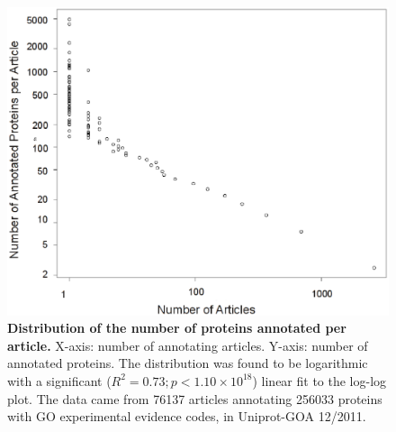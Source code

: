 \documentclass[12pt]{article}
\begin{document}
\begin{figure}[!ht]
\begin{center}
\includegraphics[width=6in]{papers-prots.eps}
\end{center}
\caption{
{\bf Distribution of the number of proteins annotated per article.} X-axis: number of annotating
articles. Y-axis: number of annotated proteins. The distribution was found to be logarithmic with a
significant ($R^2=0.73; p<1.10\times 10^{18}$) linear fit to the log-log plot. The data came from 76137
articles annotating 256033 proteins with GO experimental evidence codes, in Uniprot-GOA 12/2011.
}
\label{fig:papers-prots}
\end{figure}
\end{document}
